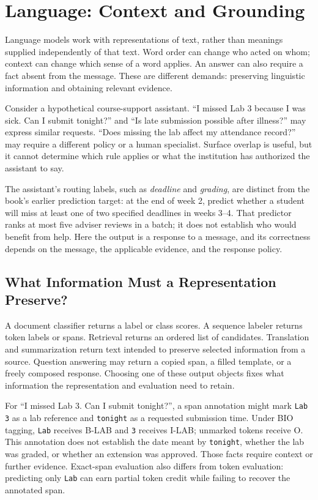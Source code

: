 \begingroup
\raggedbottom
{}
\chapter{Language: Context and Grounding}
\label{ch:language-grounding}

Language models work with representations of text, rather than meanings supplied independently of that text. Word order can change who acted on whom; context can change which sense of a word applies. An answer can also require a fact absent from the message. These are different demands: preserving linguistic information and obtaining relevant evidence.

Consider a hypothetical course-support assistant. ``I missed Lab 3 because I was sick. Can I submit tonight?'' and ``Is late submission possible after illness?'' may express similar requests. ``Does missing the lab affect my attendance record?'' may require a different policy or a human specialist. Surface overlap is useful, but it cannot determine which rule applies or what the institution has authorized the assistant to say.

The assistant's routing labels, such as \emph{deadline} and \emph{grading}, are distinct from the book's earlier prediction target: at the end of week 2, predict whether a student will miss at least one of two specified deadlines in weeks 3--4. That predictor ranks at most five adviser reviews in a batch; it does not establish who would benefit from help. Here the output is a response to a message, and its correctness depends on the message, the applicable evidence, and the response policy.

\section{What Information Must a Representation Preserve?}

A document classifier returns a label or class scores. A sequence labeler returns token labels or spans. Retrieval returns an ordered list of candidates. Translation and summarization return text intended to preserve selected information from a source. Question answering may return a copied span, a filled template, or a freely composed response. Choosing one of these output objects fixes what information the representation and evaluation need to retain.

For ``I missed Lab 3. Can I submit tonight?'', a span annotation might mark \texttt{Lab 3} as a lab reference and \texttt{tonight} as a requested submission time. Under BIO tagging, \texttt{Lab} receives B-LAB and \texttt{3} receives I-LAB; unmarked tokens receive O. This annotation does not establish the date meant by \texttt{tonight}, whether the lab was graded, or whether an extension was approved. Those facts require context or further evidence. Exact-span evaluation also differs from token evaluation: predicting only \texttt{Lab} can earn partial token credit while failing to recover the annotated span.

